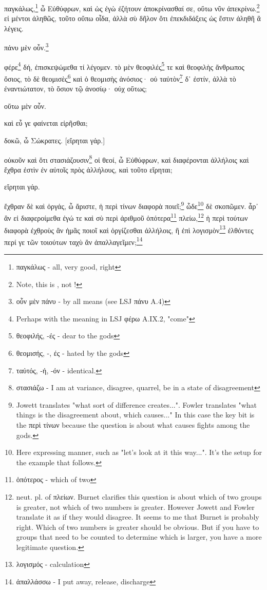 


παγκάλως,\footnote{παγκάλως - all, very good, right}
ὦ
Εὐθύφρων,
καὶ
ὡς
ἐγὼ
ἐζήτουν
ἀποκρίνασθαί
σε,
οὕτω
νῦν
ἀπεκρίνω.\footnote{Note, this is , not !}
εἰ
μέντοι
ἀληθῶς,
τοῦτο
οὔπω
οἶδα,
ἀλλὰ
σὺ
δῆλον
ὅτι
ἐπεκδιδάξεις
ὡς
ἔστιν
ἀληθῆ
ἃ
λέγεις.

πάνυ
μὲν
οὖν.\footnote{οὖν μὲν πάνυ - by all means (see LSJ πάνυ A.4)}

φέρε\footnote{Perhaps with the meaning in LSJ φέρω A.IX.2, "come"}
δή,
ἐπισκεψώμεθα
τί
λέγομεν.
τὸ
μὲν
θεοφιλές\footnote{θεοφιλής, -ές - dear to the gods}
τε
καὶ
θεοφιλὴς
ἄνθρωπος
ὅσιος,
τὸ
δὲ
θεομισὲς\footnote{θεομισής, -, ές - hated by the gods}
καὶ
ὁ
θεομισὴς
ἀνόσιος·
οὐ
ταὐτὸν\footnote{ταὐτός, -ή, -όν - identical.}
δ᾽
ἐστίν,
ἀλλὰ
τὸ
ἐναντιώτατον,
τὸ
ὅσιον
τῷ
ἀνοσίῳ·
οὐχ
οὕτως;

οὕτω
μὲν
οὖν.

καὶ
εὖ
γε
φαίνεται
εἰρῆσθαι; 

\versification{[7b]}
δοκῶ,
ὦ
Σώκρατες.
[εἴρηται
γάρ.]

οὐκοῦν
καὶ
ὅτι
στασιάζουσιν\footnote{στασιάζω - I am at variance, disagree, quarrel, be in a state of disagreement}
οἱ
θεοί,
ὦ
Εὐθύφρων,
καὶ
διαφέρονται
ἀλλήλοις
καὶ
ἔχθρα
ἐστὶν
ἐν
αὐτοῖς
πρὸς
ἀλλήλους,
καὶ
τοῦτο
εἴρηται;

εἴρηται
γάρ.

ἔχθραν
δὲ
καὶ
ὀργάς,
ὦ
ἄριστε,
ἡ
περὶ
τίνων
διαφορὰ
ποιεῖ;\footnote{Jowett translates "what sort of difference creates...". Fowler translates "what things is the disagreement about, which causes..." In this case the key bit is the περὶ τίνων because the question is about what causes fights among the gods.}
ὧδε\footnote{Here expressing manner, such as "let's look at it this way...". It's the setup for the example that follows.}
δὲ
σκοπῶμεν.
ἆρ᾽
ἂν
εἰ
διαφεροίμεθα
ἐγώ
τε
καὶ
σὺ
περὶ
ἀριθμοῦ
ὁπότερα\footnote{ὁπότερος - which of two}
πλείω,\footnote{neut. pl. of πλείων. Burnet clarifies this question is about which of two groups is greater, not which of two numbers is greater. However Jowett and Fowler translate it as if they would disagree. It seems to me that Burnet is probably right. Which of two numbers is greater should be obvious. But if you have to groups that need to be counted to determine which is larger, you have a more legitimate question.}
ἡ
περὶ
τούτων
διαφορὰ
ἐχθροὺς
ἂν
ἡμᾶς
ποιοῖ
καὶ
ὀργίζεσθαι
ἀλλήλοις,
ἢ
ἐπὶ
λογισμὸν\footnote{λογισμός - calculation}
ἐλθόντες
περί
γε
τῶν
τοιούτων
ταχὺ
ἂν
\versification{[7c]}
ἀπαλλαγεῖμεν;\footnote{ἀπαλλάσσω - I put away, release, discharge}


